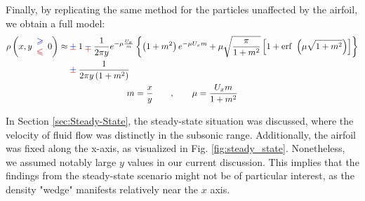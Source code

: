 Finally, by replicating the same method for the particles unaffected by the airfoil, we obtain a full model:
\begin{gather}
\begin{aligned}
\rho\left(
x,y\begin{array}{ c }
\textcolor[rgb]{0,0,1}{\geqslant }\\
\textcolor[rgb]{1,0,0}{\leqslant }
\end{array} 0
\right)\approx
&  \cpm 1 \cmp\frac{1}{2\pi y} e^{-\mu \frac{U_{x}}{m}}\left\{\left( 1+m^{2}\right) e^{-\mu U_{x} m} + \mu \sqrt{\frac{\pi }{1+m^{2}}}\left[ 1+\mathrm{erf} \ \left( \mu \sqrt{1+m^{2}}\right)\right]\right\}\\
 & \cpm\frac{1}{2\pi y\left( 1+m^{2}\right)}
\end{aligned} \\
m=\frac{x}{y} \quad \quad ,\quad \quad \mu =\frac{U_{x} m}{1+m^2}
\nonumber
\end{gather}

In Section \ref{sec:Steady-State}, the steady-state situation was discussed, where the velocity of fluid flow was distinctly in the subsonic range. Additionally, the airfoil was fixed along the x-axis, as visualized in Fig. \ref{fig:steady_state}. Nonetheless, we assumed notably large $y$ values in our current discussion. This implies that the findings from the steady-state scenario might not be of particular interest, as the density "wedge" manifests relatively near the $x$ axis.

